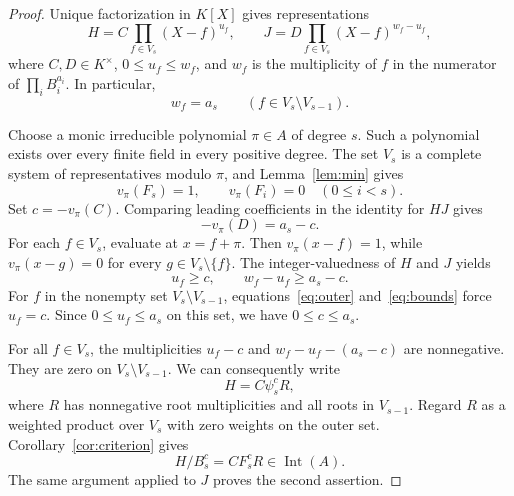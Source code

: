 \documentclass[11pt]{article}
\theoremstyle{remark}
\newcommand{\Int}{\operatorname{Int}}
\begin{document}
\begin{proof}
Unique factorization in $K[X]$ gives representations
\[
 H=C\prod_{f\in V_s}(X-f)^{u_f},\qquad
 J=D\prod_{f\in V_s}(X-f)^{w_f-u_f},
\]
where $C,D\in K^\times$, $0\leq u_f\leq w_f$, and $w_f$ is the multiplicity of $f$ in the numerator of $\prod_iB_i^{a_i}$. In particular,
\begin{equation}\label{eq:outer}
 w_f=a_s\qquad(f\in V_s\setminus V_{s-1}).
\end{equation}

Choose a monic irreducible polynomial $\pi\in A$ of degree $s$. Such a polynomial exists over every finite field in every positive degree. The set $V_s$ is a complete system of representatives modulo $\pi$, and Lemma~\ref{lem:min} gives
\[
 v_\pi(F_s)=1,\qquad v_\pi(F_i)=0\quad(0\leq i<s).
\]
Set $c=-v_\pi(C)$. Comparing leading coefficients in the identity for $HJ$ gives
\[
 -v_\pi(D)=a_s-c.
\]
For each $f\in V_s$, evaluate at $x=f+\pi$. Then $v_\pi(x-f)=1$, while $v_\pi(x-g)=0$ for every $g\in V_s\setminus\{f\}$. The integer-valuedness of $H$ and $J$ yields
\begin{equation}\label{eq:bounds}
 u_f\geq c,\qquad w_f-u_f\geq a_s-c.
\end{equation}
For $f$ in the nonempty set $V_s\setminus V_{s-1}$, equations~\eqref{eq:outer} and~\eqref{eq:bounds} force $u_f=c$. Since $0\leq u_f\leq a_s$ on this set, we have $0\leq c\leq a_s$.

For all $f\in V_s$, the multiplicities $u_f-c$ and $w_f-u_f-(a_s-c)$ are nonnegative. They are zero on $V_s\setminus V_{s-1}$. We can consequently write
\[
 H=C\psi_s^cR,
\]
where $R$ has nonnegative root multiplicities and all roots in $V_{s-1}$. Regard $R$ as a weighted product over $V_s$ with zero weights on the outer set. Corollary~\ref{cor:criterion} gives
\[
 H/B_s^c=CF_s^cR\in\Int(A).
\]
The same argument applied to $J$ proves the second assertion.
\end{proof}
\end{document}
